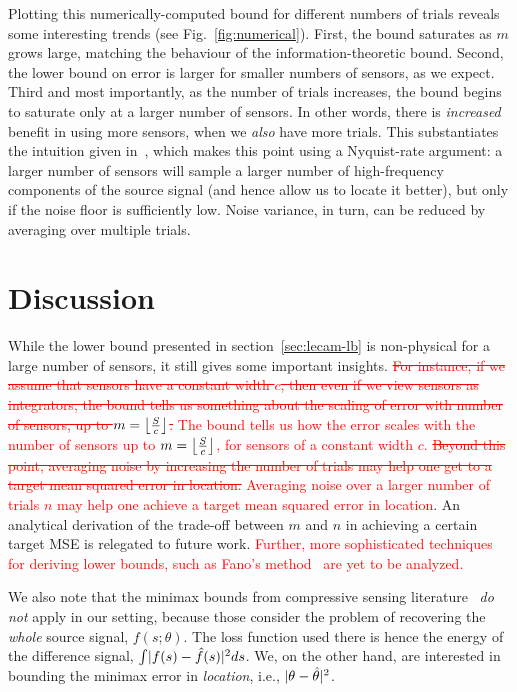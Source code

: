 \documentclass[conference,letterpaper]{IEEEtran}
\DeclarePairedDelimiter\abs{\lvert}{\rvert}
\DeclarePairedDelimiter\floor{\lfloor}{\rfloor}
\begin{document}
Plotting this numerically-computed bound for different numbers of trials
reveals some interesting trends (see Fig.~\ref{fig:numerical}). First, the
bound saturates as $m$ grows large, matching the behaviour of the
information-theoretic bound. Second, the lower bound on error is larger for
smaller numbers of sensors, as we expect. Third and most importantly, as the
number of trials increases, the bound begins to saturate only at a larger
number of sensors. In other words, there is \emph{increased} benefit in using
more sensors, when we \emph{also} have more trials. This substantiates the
intuition given in~\cite{Grover2016Information}, which makes this point using a
Nyquist-rate argument: a larger number of sensors will sample a larger number
of high-frequency components of the source signal (and hence allow us to locate
it better), but only if the noise floor is sufficiently low. Noise variance, in
turn, can be reduced by averaging over multiple trials.

\section{Discussion}
\label{sec:discussion}

While the lower bound presented in section~\ref{sec:lecam-lb} is non-physical
for a large number of sensors, it still gives some important insights.
\textcolor{red}{\sout{For instance, if we assume that sensors have a constant
		width $c$, then even if we view sensors as integrators, the bound tells
		us something about the scaling of error with number of sensors, up to
		$m = \floor*{\frac{S}{c}}$.} The bound tells us how the error scales
	with the number of sensors up to $m = \floor*{\frac{S}{c}}$, for sensors of
	a constant width $c$.} \textcolor{red}{\sout{Beyond this point, averaging
		noise by increasing the number of trials may help one get to a target
		mean squared error in location.} Averaging noise over a larger number
	of trials $n$ may help one achieve a target mean squared error in
	location}. An analytical derivation of the trade-off between $m$ and $n$ in
achieving a certain target MSE is relegated to future work. \textcolor{red}{Further, more sophisticated techniques for deriving lower bounds, such as Fano's method~\cite[Sec.~2.7.1]{Tsybakov2009Introduction} are yet to be analyzed.}

We also note that the minimax bounds from compressive sensing
literature~\cite{AriasCastro2013Fundamental} \emph{do not} apply in our
setting, because those consider the problem of recovering the \emph{whole}
source signal, $f(s;\theta)$. The loss function used there is hence the energy
of the difference signal, $\int \abs{f(s) - \hat f(s)}^2 ds$. We, on the other
hand, are interested in bounding the minimax error in \emph{location}, i.e.,
$\abs{\theta - \hat\theta}^2$.
\end{document}
